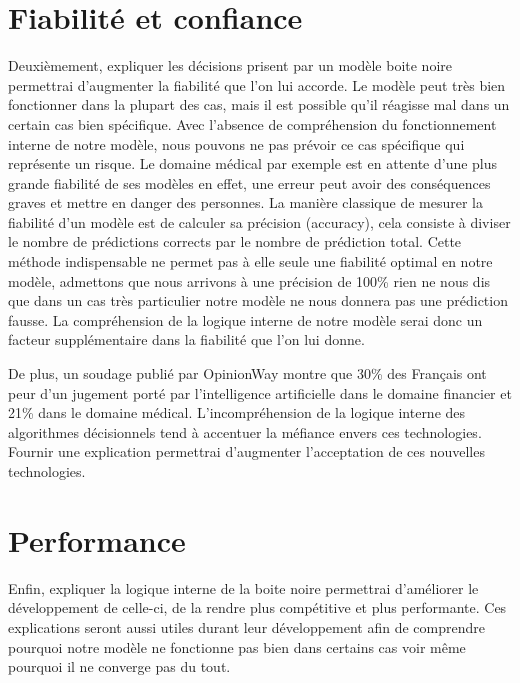 \section{Fiabilité et confiance}
Deuxièmement, expliquer les décisions prisent par un modèle boite noire permettrai d'augmenter la fiabilité que l'on lui accorde. Le modèle peut très bien fonctionner dans la plupart des cas, mais il est possible qu'il réagisse mal dans un certain cas bien spécifique. Avec l'absence de compréhension du fonctionnement interne de notre modèle, nous pouvons ne pas prévoir ce cas spécifique qui représente un risque. Le domaine médical par exemple est en attente d'une plus grande fiabilité de ses modèles en effet, une erreur peut avoir des conséquences graves et mettre en danger des personnes. La manière classique de mesurer la fiabilité d'un modèle est de calculer sa précision (accuracy), cela consiste à diviser le nombre de prédictions corrects par le nombre de prédiction total. Cette méthode indispensable ne permet pas à elle seule une fiabilité optimal en notre modèle, admettons que nous arrivons à une précision de 100\% rien ne nous dis que dans un cas très particulier notre modèle ne nous donnera pas une prédiction fausse. La compréhension de la logique interne de notre modèle serai donc un facteur supplémentaire dans la fiabilité que l'on lui donne. \par
De plus, un soudage publié par OpinionWay\cite{opinionWay} montre que 30\% des Français ont peur d'un jugement porté par l'intelligence artificielle dans le domaine financier et 21\% dans le domaine médical. L'incompréhension de la logique interne des algorithmes décisionnels tend à accentuer la méfiance envers ces technologies. Fournir une explication permettrai d'augmenter l'acceptation de ces nouvelles technologies.

\section{Performance}
Enfin, expliquer la logique interne de la boite noire permettrai d'améliorer le développement de celle-ci, de la rendre plus compétitive et plus performante. Ces explications seront aussi utiles durant leur développement afin de comprendre pourquoi notre modèle ne fonctionne pas bien dans certains cas voir même pourquoi il ne converge pas du tout.
